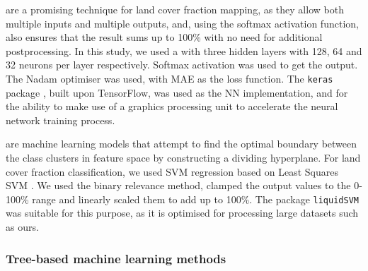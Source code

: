 \documentclass[review,authoryear,3p]{elsarticle}
\begin{document}
 are a promising technique for land cover fraction mapping, as they allow both multiple inputs and multiple outputs, and, using the softmax activation function, also ensures that the result sums up to 100\% with no need for additional postprocessing.
In this study, we used a  \citep{dreyfus_artificial_1990} with three hidden layers with 128, 64 and 32 neurons per layer respectively.
Softmax activation was used to get the output.
The Nadam optimiser \citep{dozat_incorporating_2016} was used, with \gls{MAE} as the loss function.
The \texttt{keras} package \citep{keras}, built upon TensorFlow, was used as the \ac{NN} implementation, and for the ability to make use of a graphics processing unit to accelerate the neural network training process.


 are machine learning models that attempt to find the optimal boundary between the class clusters in feature space by constructing a dividing hyperplane.
For land cover fraction classification, we used \gls{SVM} regression based on Least Squares \gls{SVM} \citep{suykens_least_1999}.
We used the binary relevance method, clamped the output values to the 0-100\% range and linearly scaled them to add up to 100\%.
The package \texttt{liquidSVM} \citep{liquidSVM} was suitable for this purpose, as it is optimised for processing large datasets such as ours.

\subsubsection{Tree-based machine learning methods}
\end{document}
